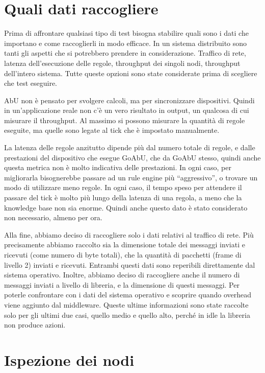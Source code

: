 \documentclass[target=bach]{thud}
\begin{document}
\section{Quali dati raccogliere}\label{raccolta:quali}

Prima di affrontare qualsiasi tipo di test bisogna stabilire quali sono i dati che importano e come raccoglierli in modo efficace.
In un sistema distribuito sono tanti gli aspetti che si potrebbero prendere in considerazione. Traffico di rete, latenza dell'esecuzione delle regole, throughput dei singoli nodi, throughput dell'intero sistema. Tutte queste opzioni sono state considerate prima di scegliere che test eseguire.

AbU non è pensato per svolgere calcoli, ma per sincronizzare dispositivi.
Quindi in un'applicazione reale non c'è un vero risultato in output, un qualcosa di cui misurare il throughput. Al massimo si possono misurare la quantità di regole eseguite, ma quelle sono legate al tick che è impostato manualmente.

La latenza delle regole anzitutto dipende più dal numero totale di regole, e dalle prestazioni del dispositivo che esegue GoAbU, che da GoAbU stesso, quindi anche questa metrica non è molto indicativa delle prestazioni.
In ogni caso, per migliorarla bisognerebbe passare ad un rule engine più ``aggressivo'', o trovare un modo di utilizzare meno regole.
In ogni caso, il tempo speso per attendere il passare del tick è molto più lungo della latenza di una regola, a meno che la knowledge base non sia enorme.
Quindi anche questo dato è stato considerato non necessario, almeno per ora.

Alla fine, abbiamo deciso di raccogliere solo i dati relativi al traffico di rete. Più precisamente abbiamo raccolto sia la dimensione totale dei messaggi inviati e ricevuti (come numero di byte totali), che la quantità di pacchetti (frame di livello 2) inviati e ricevuti. Entrambi questi dati sono reperibili direttamente dal sistema operativo.
Inoltre, abbiamo deciso di raccogliere anche il numero di messaggi inviati a livello di libreria, e la dimensione di questi messaggi. Per poterle confrontare con i dati del sistema operativo e scoprire quando overhead viene aggiunto dal middleware.
Queste ultime informazioni sono state raccolte solo per gli ultimi due casi, quello medio e quello alto, perché in idle la libreria non produce azioni.

\section{Ispezione dei nodi}
\end{document}
